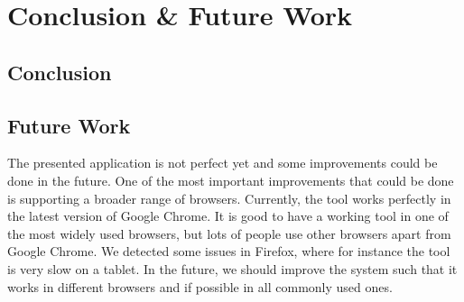\chapter{Conclusion \& Future Work}\label{ch:conclusion-future-work}

\section{Conclusion}\label{sec:conclusion}

\section{Future Work}\label{sec:future-work}
The presented application is not perfect yet and some improvements could be done in the future. One of the most important improvements that could be done is supporting a broader range of browsers. Currently, the tool works perfectly in the latest version of Google Chrome. It is good to have a working tool in one of the most widely used browsers, but lots of people use other browsers apart from Google Chrome. We detected some issues in Firefox, where for instance the tool is very slow on a tablet. In the future, we should improve the system such that it works in different browsers and if possible in all commonly used ones.